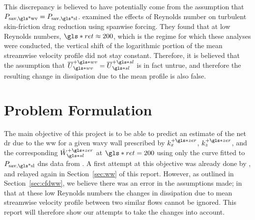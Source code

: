 This discrepancy is believed to have potentially come from the assumption that $P_\text{sav,\gls*{wv}}= P _\text{sav,\gls*{sl}} $. \textcite{gatti2016} examined the effects of Reynolds number on turbulent skin-friction drag reduction using spanwise forcing. They found that at low Reynolds numbers, $\gls*{ret}\approx200$, which is the regime for which these analyses were conducted, the vertical shift of the logarithmic portion of the mean streamwise velocity profile did not stay constant. Therefore, it is believed that the assumption that $\overline{U}\pw\ww=\overline{U}\ps\ssl$ is in fact untrue, and therefore the resulting change in dissipation due to the mean profile is also false.

\section{Problem Formulation}\label{sec:objective} 
The main objective of this project is to be able to predict an estimate of the net \gls*{dr} due to the \gls*{ww} for a given wavy wall prescribed by $k_x\pz$, $k_z\pz$, and the corresponding $\hat{W}\pz\ssl$ at $ \gls*{ret}=200$ using only the curve fitted to $P_\text{sav,\gls*{sl}} $ \gls*{dns} data from \vqt. A first attempt at this objective was already done by \sct, and relayed again in Section~\ref{sec:ww} of this report. However, as outlined in Section~\ref{sec:cfdww}, we believe there was an error in the assumptions made; in that at these low Reynolds numbers the changes in dissipation due to mean streamwise velocity profile between two similar flows cannot be ignored. This report will therefore show our attempts to take the changes into account.





